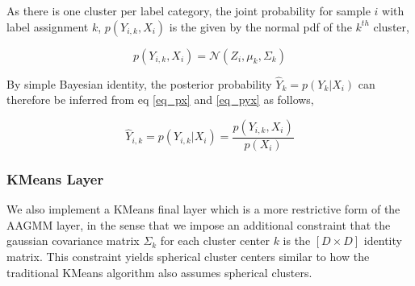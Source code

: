 \documentclass[10pt,twocolumn,letterpaper]{article}
\begin{document}
As there is one cluster per label category, the joint probability for sample $i$ with label assignment $k$, $p(Y_{i,k},X_i)$ is the given by the normal pdf of the $k^{th}$ cluster,

\begin{equation}
	\label{eq_pyx}
	p(Y_{i,k},X_i) = \mathcal{N} (Z_i, \mu_{k}, \Sigma_k) \end{equation}

By simple Bayesian identity, the posterior probability $\hat{Y}_k=p(Y_{k}|X_i)$ can therefore be inferred from eq \ref{eq_px} and \ref{eq_pyx} as follows,

\begin{equation}
	\hat{Y}_{i,k} = p(Y_{i,k}|X_i) = \frac{p(Y_{i,k}, X_i)}{p(X_i)}
\end{equation}

%

%

\subsubsection{KMeans Layer}

We also implement a KMeans final layer which is a more restrictive form of the AAGMM layer, in the sense that we impose an additional constraint that the gaussian covariance matrix $\Sigma_k$ for each cluster center $k$ is the $[D \times D]$ identity matrix. 
This constraint yields spherical cluster centers similar to how the traditional KMeans algorithm also assumes spherical clusters.
\end{document}
